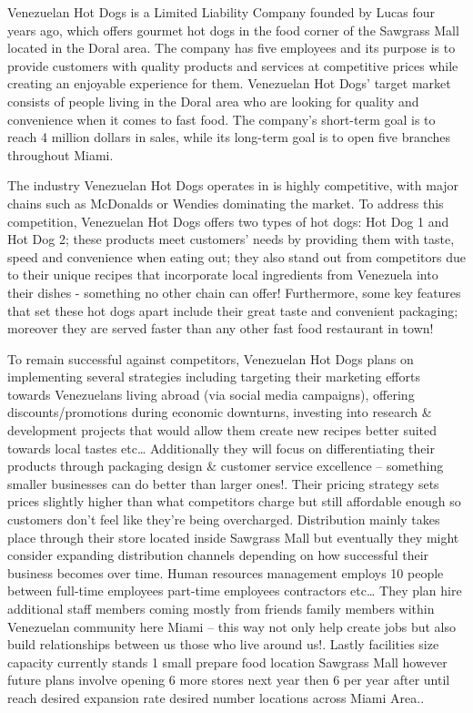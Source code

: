 
Venezuelan Hot Dogs is a Limited Liability Company founded by Lucas four years ago, which offers gourmet hot dogs in the food corner of the Sawgrass Mall located in the Doral area. The company has five employees and its purpose is to provide customers with quality products and services at competitive prices while creating an enjoyable experience for them. Venezuelan Hot Dogs' target market consists of people living in the Doral area who are looking for quality and convenience when it comes to fast food. The company's short-term goal is to reach 4 million dollars in sales, while its long-term goal is to open five branches throughout Miami. 

The industry Venezuelan Hot Dogs operates in is highly competitive, with major chains such as McDonalds or Wendies dominating the market. To address this competition, Venezuelan Hot Dogs offers two types of hot dogs: Hot Dog 1 and Hot Dog 2; these products meet customers' needs by providing them with taste, speed and convenience when eating out; they also stand out from competitors due to their unique recipes that incorporate local ingredients from Venezuela into their dishes - something no other chain can offer! Furthermore, some key features that set these hot dogs apart include their great taste and convenient packaging; moreover they are served faster than any other fast food restaurant in town!  

To remain successful against competitors, Venezuelan Hot Dogs plans on implementing several strategies including targeting their marketing efforts towards Venezuelans living abroad (via social media campaigns), offering discounts/promotions during economic downturns, investing into research & development projects that would allow them create new recipes better suited towards local tastes etc… Additionally they will focus on differentiating their products through packaging design & customer service excellence – something smaller businesses can do better than larger ones!. Their pricing strategy sets prices slightly higher than what competitors charge but still affordable enough so customers don’t feel like they’re being overcharged. Distribution mainly takes place through their store located inside Sawgrass Mall but eventually they might consider expanding distribution channels depending on how successful their business becomes over time. Human resources management employs 10 people between full-time employees part-time employees contractors etc… They plan hire additional staff members coming mostly from friends family members within Venezuelan community here Miami – this way not only help create jobs but also build relationships between us those who live around us!. Lastly facilities size capacity currently stands 1 small prepare food location Sawgrass Mall however future plans involve opening 6 more stores next year then 6 per year after until reach desired expansion rate desired number locations across Miami Area..   

